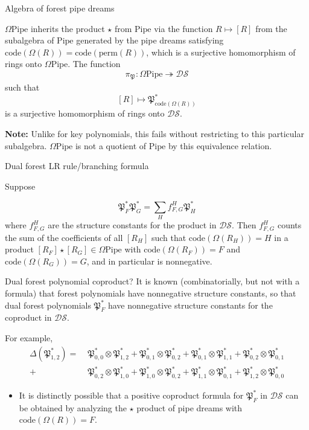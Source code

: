 \documentclass[aspectratio=169]{beamer}
\newcommand{\code}{\mathrm{code}}
\newcommand{\dcoma}{\mathcal{DS}}
\newcommand{\Forest}[1]{\mathfrak{P}_{#1}}
\newcommand{\RC}{\mathrm{Pipe}}
\begin{document}
\begin{frame}{Algebra of forest pipe dreams}
    \begin{theorem}[S, 2026+]
    $\Omega\RC$ inherits the product $\star$ from $\RC$ via the function $R\mapsto [R]$ from the subalgebra of $\RC$ generated by the pipe dreams satisfying $\code(\Omega(R))=\code(\mathrm{perm}(R))$, which is a surjective homomorphism of rings onto $\Omega\RC$. The function
    $$\pi_{\Forest{}}:\Omega\RC\twoheadrightarrow\dcoma$$
    such that
    $$[R]\mapsto \Forest{\mathrm{code}(\Omega(R))}^*$$
    is a surjective homomorphism of rings onto $\dcoma$.
    \end{theorem}
    {\textbf{Note:}} Unlike for key polynomials, this fails without restricting to this particular subalgebra. $\Omega\RC$ is not a quotient of $\RC$ by this equivalence relation.
\end{frame}

\begin{frame}{Dual forest LR rule/branching formula}
  \begin{theorem}[S, 2026+]
    Suppose
    
    $$\Forest{F}^*\Forest{G}^* = \sum_H f_{F,G}^H \Forest{H}^*$$
    where $f_{F,G}^H$ are the structure constants for the product in $\dcoma$. Then $f_{F,G}^H$ counts the sum of the coefficients of all $[R_H]$ such that $\code(\Omega(R_H))=H$ in a product $[R_F]\star [R_G]\in\Omega\RC$ with $\code(\Omega(R_F)) = F$ and $\code(\Omega(R_G)) = G$, and in particular is nonnegative.
  \end{theorem}
  
\end{frame}

\begin{frame}{Dual forest polynomial coproduct?}
  It is known (combinatorially, but not with a formula) that forest polynomials have nonnegative structure constants, so that dual forest polynomials $\Forest{F}^*$ have nonnegative structure constants for the coproduct in $\dcoma$. 
  
  For example,
  \begin{align*}
    \Delta\!\left(\Forest{1,2}^*\right) =\;
      &\Forest{0,0}^*\!\otimes\!\Forest{1,2}^*
      + \Forest{0,1}^*\!\otimes\!\Forest{0,2}^*
      + \Forest{0,1}^*\!\otimes\!\Forest{1,1}^*
      + \Forest{0,2}^*\!\otimes\!\Forest{0,1}^* \\
      +\;&\Forest{0,2}^*\!\otimes\!\Forest{1,0}^*
      + \Forest{1,0}^*\!\otimes\!\Forest{0,2}^*
      + \Forest{1,1}^*\!\otimes\!\Forest{0,1}^*
      + \Forest{1,2}^*\!\otimes\!\Forest{0,0}^*
  \end{align*}
  \begin{itemize}
  \item It is distinctly possible that a positive coproduct formula for $\Forest{F}^*$ in $\dcoma$ can be obtained by analyzing the $\star$ product of pipe dreams with $\code(\Omega(R)) = F$.
  \end{itemize}
\end{frame}
\end{document}
